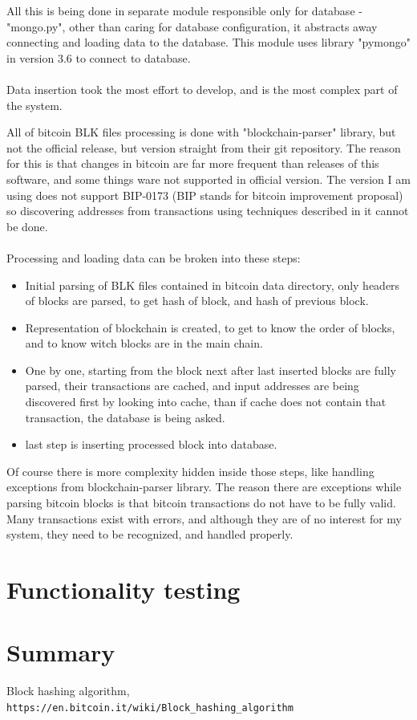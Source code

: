\documentclass[12pt, en, eng]{mgr}
\begin{document}
All this is being done in separate module responsible only for database - "mongo.py", other than caring for database configuration, it abstracts away connecting and loading data to the database. This module uses library "pymongo" in version 3.6 to connect to database.
\\
\\  
Data insertion took the most effort to develop, and is the most complex part of the system.

All of bitcoin BLK files processing is done with "blockchain-parser" library, but not the official release, but version straight from their git repository. The reason for this is that changes in bitcoin are far more frequent than releases of this software, and some things ware not supported in official version. The version I am using does not support BIP-0173 (BIP stands for bitcoin improvement proposal) so discovering addresses from transactions using techniques described in it cannot be done. 
\\
\\
Processing and loading data can be broken into these steps:
\begin{itemize}
\item
Initial parsing of BLK files contained in bitcoin data directory, only headers of blocks are parsed, to get hash of block, and hash of previous block.
\item
Representation of blockchain is created, to get to know the order of blocks, and to know witch blocks are in the main chain.
\item
One by one, starting from the block next after last inserted blocks are fully parsed, their transactions are cached, and input addresses are being discovered first by looking into cache, than if cache does not contain that transaction, the database is being asked.
\item
last step is inserting processed block into database.
\end{itemize}

Of course there is more complexity hidden inside those steps, like handling exceptions from blockchain-parser library. The reason there are exceptions while parsing bitcoin blocks is that bitcoin transactions do not have to be fully valid. Many transactions exist with errors, and although they are of no interest for my system, they need to be recognized, and handled properly.




\section{Functionality testing}

\section{Summary}

\begin{thebibliography}{9}
 
Block hashing algorithm,
\\\texttt{https://en.bitcoin.it/wiki/Block\_hashing\_algorithm}
\end{thebibliography}
\end{document}
